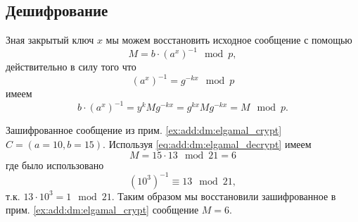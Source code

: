 \subsection{Дешифрование}
Зная закрытый ключ $x$ мы можем восстановить исходное сообщение с
помощью
\begin{equation}
M = b\cdot \left(a^x\right)^{-1} \mod p,
\label{eq:add:dm:elgamal_decrypt}
\end{equation}
действительно в силу того что
\[
\left(a^x\right)^{-1} = g^{-kx} \mod p
\]
имеем
\[
b\cdot \left(a^x\right)^{-1} = 
y^k M g^{-kx} = g^{kx} M g^{-kx} = M \mod p.
\]
\begin{example}
Зашифрованное сообщение из прим. \ref{ex:add:dm:elgamal_crypt} 
$C = (a=10, b=15)$. Используя \eqref{eq:add:dm:elgamal_decrypt} имеем
\[
M = 15 \cdot 13 \mod 21 = 6
\]
где было использовано
\[
\left(10^3\right)^{-1} \equiv 13 \mod 21,
\]
т.к. $13 \cdot 10^3 = 1 \mod 21$.
Таким образом мы восстановили зашифрованное в
прим. \ref{ex:add:dm:elgamal_crypt} сообщение $M=6$.
\label{ex:add:dm:elgamal_crypt}
\end{example}
